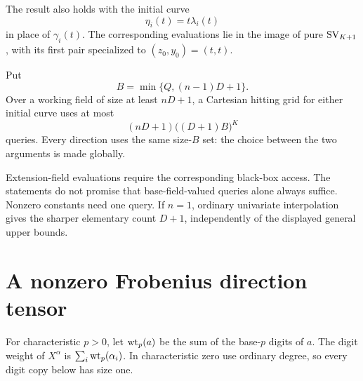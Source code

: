 The result also holds with the initial curve
\begin{equation}\label{eq:eta}
 \eta_i(t)=t\lambda_i(t)
\end{equation}
in place of $\gamma_i(t)$. The corresponding evaluations lie in the
image of pure $\operatorname{SV}_{K+1}$, with its first pair specialized to
$(z_0,y_0)=(t,t)$.

\begin{corollary}\label{cor:min}
Put
\[
 B=\min\{Q,(n-1)D+1\}.
\]
Over a working field of size at least $nD+1$, a Cartesian hitting
grid for either initial curve uses at most
\begin{equation}\label{eq:mincount}
 (nD+1)\bigl((D+1)B\bigr)^K
\end{equation}
queries. Every direction uses the same size-$B$ set: the choice
between the two arguments is made globally.
\end{corollary}

Extension-field evaluations require the corresponding black-box access.
The statements do not promise that base-field-valued queries alone
always suffice. Nonzero constants need one query. If $n=1$, ordinary
univariate interpolation gives the sharper elementary count $D+1$,
independently of the displayed general upper bounds.

\section{A nonzero Frobenius direction tensor}

For characteristic $p>0$, let $\operatorname{wt}_p(a)$ be the sum of the base-$p$
digits of $a$. The digit weight of $X^\alpha$ is
$\sum_i\operatorname{wt}_p(\alpha_i)$. In characteristic zero use ordinary degree,
so every digit copy below has size one.

